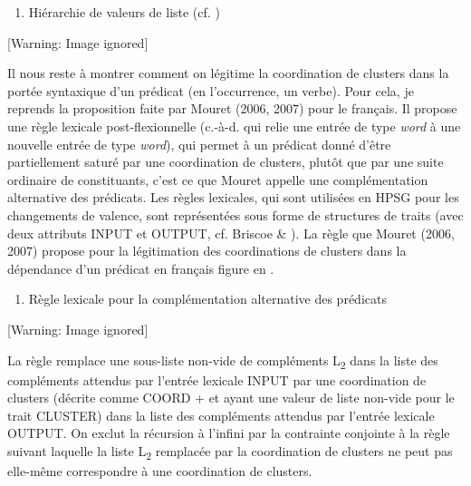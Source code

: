 \begin{enumerate}
\item \label{bkm:Ref300047412}\label{bkm:Ref299887457}Hiérarchie de valeurs de liste (cf. \citet{Mouret2007})


\end{enumerate}
{   [Warning: Image ignored] %
} 

Il nous reste à montrer comment on légitime la coordination de clusters dans la portée syntaxique d'un prédicat (en l'occurrence, un verbe). Pour cela, je reprends la proposition faite par Mouret (2006, 2007) pour le français. Il propose une règle lexicale post-flexionnelle (c.-à-d. qui relie une entrée de type \textit{word} à une nouvelle entrée de type \textit{word}), qui permet à un prédicat donné d'être partiellement saturé par une coordination de clusters, plutôt que par une suite ordinaire de constituants, c'est ce que Mouret appelle une complémentation alternative des prédicats. Les règles lexicales, qui sont utilisées en HPSG pour les changements de valence, sont représentées sous forme de structures de traits (avec deux attributs  INPUT et OUTPUT, cf. Briscoe \& \citet{Copestake1999}). La règle que Mouret (2006, 2007) propose pour la légitimation des coordinations de clusters dans la dépendance d'un prédicat en français figure en . 


\begin{enumerate}
\item \label{bkm:Ref300048035}Règle lexicale pour la complémentation alternative des prédicats


\end{enumerate}
  [Warning: Image ignored] %
 

La règle remplace une sous-liste non-vide de compléments L\textsubscript{2} dans la liste des compléments attendus par l'entrée lexicale INPUT par une coordination de clusters (décrite comme COORD + et ayant une valeur de liste non-vide pour le trait CLUSTER) dans la liste des compléments attendus par l'entrée lexicale OUTPUT. On exclut la récursion à l'infini par la contrainte conjointe à la règle suivant laquelle la liste L\textsubscript{2} remplacée par la coordination de clusters ne peut pas elle-même correspondre à une coordination de clusters.

